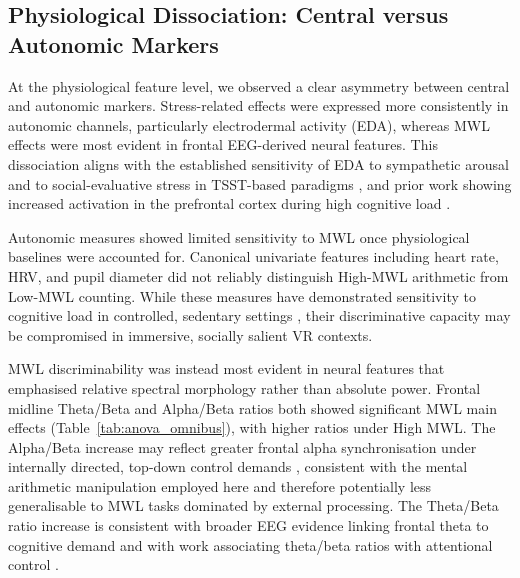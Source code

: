 \documentclass[lettersize,journal]{IEEEtran}
\begin{document}
\subsection{Physiological Dissociation: Central versus Autonomic Markers}


At the physiological feature level, we observed a clear asymmetry between central and autonomic markers. Stress-related effects were expressed more consistently in autonomic channels, particularly electrodermal activity (EDA), whereas MWL effects were most evident in frontal EEG-derived neural features. This dissociation aligns with the established sensitivity of EDA to sympathetic arousal \cite{faircloughFundamentalsPhysiologicalComputing2009, masiStressWorkloadAssessment2023} and to social-evaluative stress in TSST-based paradigms \cite{alonsoStressAssessmentBased2015, goodmanMetaanalyticalAssessmentEffects2017}, and prior work showing increased activation in the prefrontal cortex during high cognitive load \cite{causseMentalWorkloadNeural2017}.

Autonomic measures showed limited sensitivity to MWL once physiological baselines were accounted for. Canonical univariate features including heart rate, HRV, and pupil diameter did not reliably distinguish High-MWL arithmetic from Low-MWL counting. While these measures have demonstrated sensitivity to cognitive load in controlled, sedentary settings \cite{hughesCardiacMeasuresCognitiveWorkload2019, vanderwelPupilDilationIndex2018}, their discriminative capacity may be compromised in immersive, socially salient VR contexts.

MWL discriminability was instead most evident in neural features that emphasised relative spectral morphology rather than absolute power. Frontal midline Theta/Beta and Alpha/Beta ratios both showed significant MWL main effects (Table~\ref{tab:anova_omnibus}), with higher ratios under High MWL. The Alpha/Beta increase may reflect greater frontal alpha synchronisation under internally directed, top-down control demands \cite{benedekEEGAlphaSynchronization2011}, consistent with the mental arithmetic manipulation employed here and therefore potentially less generalisable to MWL tasks dominated by external processing. The Theta/Beta ratio increase is consistent with broader EEG evidence linking frontal theta to cognitive demand \cite{chikhiEEGPowerSpectral2022} and with work associating theta/beta ratios with attentional control \cite{putmanEEGThetaBeta2014}. 
\end{document}
